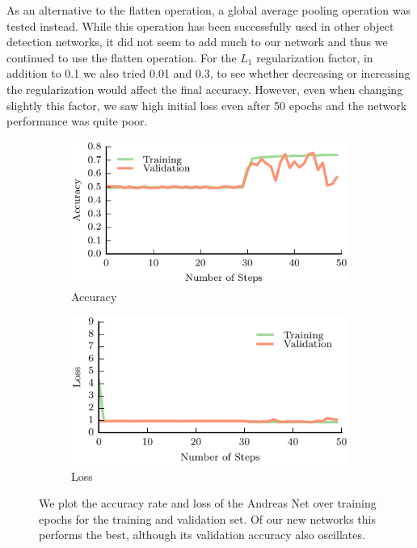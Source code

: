 As an alternative to the flatten operation, a global average pooling operation was tested instead. 
While this operation has been successfully used in other object detection networks, it did not seem to add much to our network and thus we continued to use the flatten operation. 
For the $L_{1}$ regularization factor, in addition to 0.1 we also tried 0.01 and 0.3, to see whether decreasing or increasing the regularization would affect the final accuracy. 
However, even when changing slightly this factor, we saw high initial loss even after 50 epochs and the network performance was quite poor. 


\begin{figure}[t!]
    \centering
    \begin{subfigure}[t]{0.49\textwidth}
        \includegraphics[width=0.9\columnwidth]{figs/andreas_accuracy.pdf}
        \caption{Accuracy} \label{fig:accuracy}
        \end{subfigure}
    \begin{subfigure}[t]{0.49\textwidth}
        \includegraphics[width=0.9\columnwidth]{figs/andreas_loss.pdf}
        \caption{Loss} \label{fig:loss}
    \end{subfigure}
\caption{We plot the accuracy rate and loss of the Andreas Net over training epochs for the training and validation set. Of our new networks this performs the best, although its validation accuracy also oscillates.} \label{fig:andreas_results}
\end{figure}